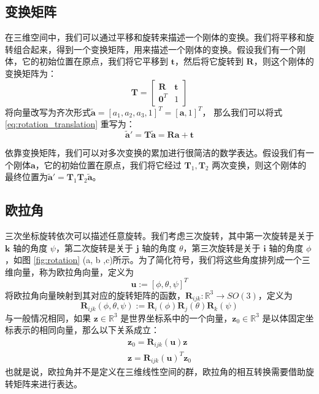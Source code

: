 \subsection{变换矩阵}
在三维空间中，我们可以通过平移和旋转来描述一个刚体的变换。我们将平移和旋转组合起来，得到一个变换矩阵，用来描述一个刚体的变换。假设我们有一个刚体，它的初始位置在原点，我们将它平移到 $\boldsymbol{t}$，然后将它旋转到 $\boldsymbol{R}$，则这个刚体的变换矩阵为：
\begin{equation}
    \boldsymbol{T} = 
    \begin{bmatrix}
    \boldsymbol{R} & \boldsymbol{t} \\
    \boldsymbol{0}^T & 1
    \end{bmatrix}
\end{equation}
将向量改写为齐次形式$\widetilde{\boldsymbol{a}} = [a_1, a_2, a_3, 1]^T = [\boldsymbol{a}, 1]^T$， 那么我们可以将式 \ref{eq:rotation_translation} 重写为：
\begin{equation}
    \widetilde{\boldsymbol{a}}' = \boldsymbol{T} \widetilde{\boldsymbol{a}} = \boldsymbol{R} \boldsymbol{a} + \boldsymbol{t}
\end{equation}  

依靠变换矩阵，我们可以对多次变换的累加进行很简洁的数学表达。假设我们有一个刚体$\boldsymbol{a}$，它的初始位置在原点，我们将它经过 $\boldsymbol{T}_1, \boldsymbol{T}_2$ 两次变换，则这个刚体的最终位置为$\widetilde{\boldsymbol{a}}' = \boldsymbol{T}_1 \boldsymbol{T}_2 \widetilde{\boldsymbol{a}}$。

\subsection{欧拉角}
三次坐标旋转依次可以描述任意旋转。我们考虑三次旋转，其中第一次旋转是关于 $\boldsymbol{k}$ 轴的角度 $\psi$，第二次旋转是关于 $\boldsymbol{j}$ 轴的角度 $\theta$，第三次旋转是关于 $\boldsymbol{i}$ 轴的角度 $\phi$，如图 \ref{fig:rotation} (a, b ,c)所示。为了简化符号，我们将这些角度排列成一个三维向量，称为欧拉角向量，定义为 
\begin{equation}
    \boldsymbol{u} := [\phi, \theta, \psi]^T
\end{equation}
将欧拉角向量映射到其对应的旋转矩阵的函数，$\boldsymbol{R}_{ijk} : \mathbb{R}^3 \to SO(3)$，定义为
\begin{equation}
    \boldsymbol{R}_{ijk}(\phi, \theta, \psi) := \boldsymbol{R}_i(\phi)\boldsymbol{R}_j(\theta)\boldsymbol{R}_k(\psi)
\end{equation}
与一般情况相同，如果 $\boldsymbol{z} \in \mathbb{R}^3$ 是世界坐标系中的一个向量，$\boldsymbol{z}_0 \in \mathbb{R}^3$ 是以体固定坐标表示的相同向量，那么以下关系成立：
\begin{align}
    \boldsymbol{z}_0 = \boldsymbol{R}_{ijk}(\boldsymbol{u}) \boldsymbol{z} \\
    \boldsymbol{z} = \boldsymbol{R}_{ijk}(\boldsymbol{u})^T \boldsymbol{z}_0
\end{align}
也就是说，欧拉角并不是定义在三维线性空间的群，欧拉角的相互转换需要借助旋转矩阵来进行表达。


